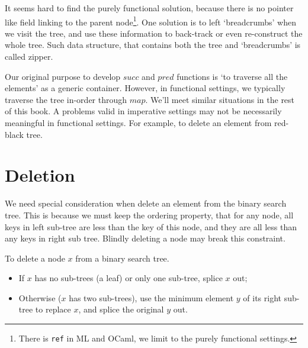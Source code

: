 \documentclass[b5paper]{article}
\begin{document}
It seems hard to find the purely functional solution, because there is no pointer like field linking to the parent node\footnote{There is \texttt{ref} in ML and OCaml, we limit to the purely functional settings.}. One solution is to left `breadcrumbs' when we visit the tree, and use these information to back-track or even re-construct the whole tree. Such data structure, that contains both the tree and `breadcrumbs' is called zipper\cite{zipper-hbook}.

Our original purpose to develop $succ$ and $pred$ functions is `to traverse all the elements' as a generic container. However, in functional settings, we typically traverse the tree in-order through $map$. We'll meet similar situations in the rest of this book. A problems valid in imperative settings may not be necessarily meaningful in functional settings. For example, to delete an element from red-black tree\cite{okasaki-blog}.

\begin{Exercise}


\end{Exercise}

\section{Deletion}
We need special consideration when delete an element from the binary search tree. This is because we must keep the ordering property, that for any node, all keys in left sub-tree are less than the key of this node, and they are all less than any keys in right sub tree. Blindly deleting a node may break this constraint.

To delete a node $x$ from a binary search tree\cite{sgi-stl}.
\begin{itemize}
\item If $x$ has no sub-trees (a leaf) or only one sub-tree, splice $x$ out;
\item Otherwise ($x$ has two sub-trees), use the minimum element $y$ of its right sub-tree to replace $x$, and splice the original $y$ out.
\end{itemize}
\end{document}
